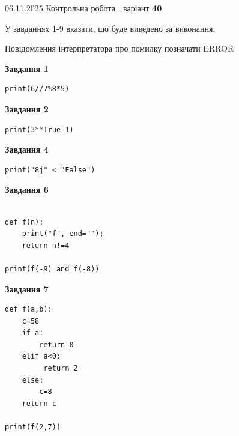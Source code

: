 \documentclass[12pt, ukrainian]{article}
\begin{document}
{\Large{06.11.2025 Контрольна робота , варіант  \No \textbf { 40 }\par}}
{
\begin {large}
У завданнях 1-9 вказати, що буде виведено за виконання.

Повідомлення інтерпретатора про помилку позначати ERROR

\begin{minipage}[t]{7.5cm}

\begin{center}
\textbf{Завдання 1}
\end{center}

\begin{verbatim}
print(6//7%8*5)
\end{verbatim}



\begin{center}
\textbf{Завдання 2}
\end{center}

\begin{verbatim}
print(3**True-1)
\end{verbatim}



\begin{center}
\textbf{Завдання 4}
\end{center}

\begin{verbatim}
print("8j" < "False")
\end{verbatim}



\begin{center}
\textbf{Завдання 6}
\end{center}

\begin{verbatim}

def f(n):
    print("f", end="");
    return n!=4

print(f(-9) and f(-8))
\end{verbatim}



\begin{center}
\textbf{Завдання 7}
\end{center}

\begin{verbatim}
def f(a,b):
    c=58
    if a:
        return 0
    elif a<0:
         return 2
    else: 
        c=8
    return c

print(f(2,7))
\end{verbatim}


\end{minipage}
\end{large}}
\end{document}
